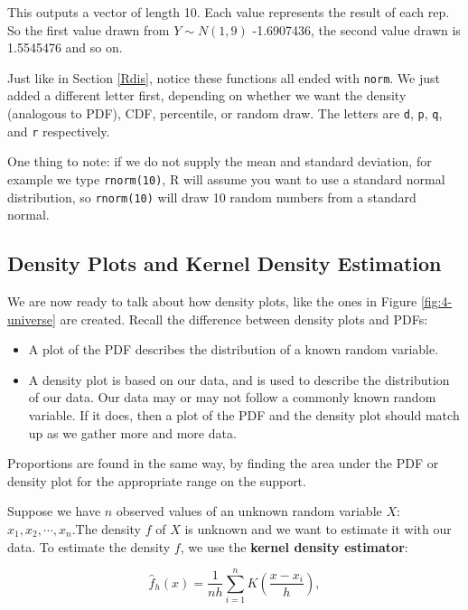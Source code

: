 \documentclass[
]{book}
\providecommand{\tightlist}{%
  \setlength{\itemsep}{0pt}\setlength{\parskip}{0pt}}
\begin{document}
This outputs a vector of length 10. Each value represents the result of each rep. So the first value drawn from \(Y \sim N(1,9)\) -1.6907436, the second value drawn is 1.5545476 and so on.

Just like in Section \ref{Rdis}, notice these functions all ended with \texttt{norm}. We just added a different letter first, depending on whether we want the density (analogous to PDF), CDF, percentile, or random draw. The letters are \texttt{d}, \texttt{p}, \texttt{q}, and \texttt{r} respectively.

One thing to note: if we do not supply the mean and standard deviation, for example we type \texttt{rnorm(10)}, R will assume you want to use a standard normal distribution, so \texttt{rnorm(10)} will draw 10 random numbers from a standard normal.

\hypertarget{KDE}{%
\subsection{Density Plots and Kernel Density Estimation}\label{KDE}}

We are now ready to talk about how density plots, like the ones in Figure \ref{fig:4-universe} are created. Recall the difference between density plots and PDFs:

\begin{itemize}
\tightlist
\item
  A plot of the PDF describes the distribution of a known random variable.
\item
  A density plot is based on our data, and is used to describe the distribution of our data. Our data may or may not follow a commonly known random variable. If it does, then a plot of the PDF and the density plot should match up as we gather more and more data.
\end{itemize}

Proportions are found in the same way, by finding the area under the PDF or density plot for the appropriate range on the support.

Suppose we have \(n\) observed values of an unknown random variable \(X\): \(x_1, x_2, \cdots, x_n\).The density \(f\) of \(X\) is unknown and we want to estimate it with our data. To estimate the density \(f\), we use the \textbf{kernel density estimator}:

\begin{equation} 
\hat{f}_h(x) = \frac{1}{nh} \sum_{i=1}^n K \left( \frac{x-x_i}{h}\right ),
\label{eq:4-KDE}
\end{equation}
\end{document}
